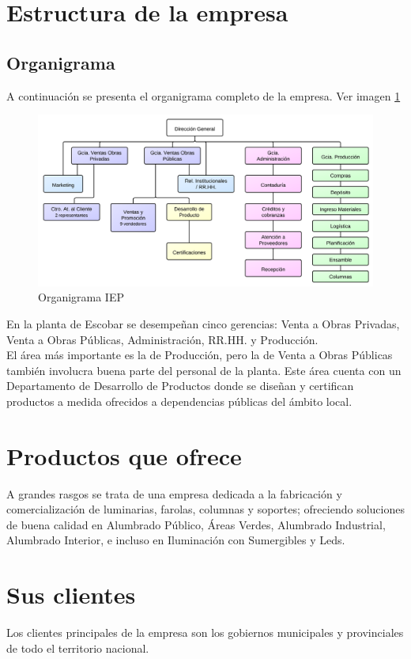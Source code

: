 \section{Estructura de la empresa}

\subsection{Organigrama}
A continuación se presenta el organigrama completo de la empresa. Ver imagen \ref{organigramaIEP}

\begin{figure}
  \centering
  \includegraphics[scale=0.85]{./Images/organigrama-pasado.png}
  \caption{Organigrama IEP}\label{organigramaIEP}
\end{figure}

En la planta de Escobar se desempe\~nan cinco gerencias: Venta a Obras Privadas, Venta a Obras P\'ublicas, Administraci\'on, RR.HH. y Producci\'on. \\
El \'area m\'as importante es la de Producci\'on, pero la de Venta a Obras P\'ublicas tambi\'en involucra buena parte del personal de la planta. Este \'area cuenta con un Departamento de Desarrollo de Productos donde se dise\~nan y certifican productos a medida ofrecidos a dependencias p\'ublicas del \'ambito local.

\section{Productos que ofrece}
A grandes rasgos se trata de una empresa dedicada a la fabricaci\'on y comercializaci\'on de luminarias, farolas, columnas y soportes; ofreciendo soluciones de buena calidad en Alumbrado P\'ublico, \'Areas Verdes, Alumbrado Industrial, Alumbrado Interior, e incluso en Iluminaci\'on con Sumergibles y Leds.

\section{Sus clientes}
Los clientes principales de la empresa son los gobiernos municipales y provinciales de todo el territorio nacional.

